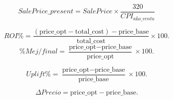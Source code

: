 \[
SalePrice\_present = SalePrice \times \frac{320}{CPI_{año\_venta}}
\]

\[
ROI \% = \frac{(\text{price\_opt} - \text{total\_cost}) - \text{price\_base}}{\text{total\_cost}} \times 100. 
\]
\[
\% Mej/final = \frac{\text{price\_opt} - \text{price\_base}}{\text{price\_opt}} \times 100. 
\]

\[
Uplift \% = \frac{\text{price\_opt} - \text{price\_base}}{\text{price\_base}} \times 100. 
\]

\[
\Delta Precio = \text{price\_opt} - \text{price\_base}.
\]